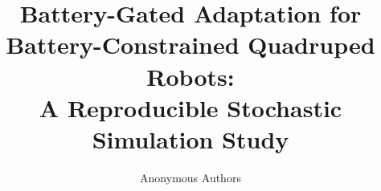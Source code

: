 \documentclass[11pt]{article}
\title{Battery-Gated Adaptation for Battery-Constrained Quadruped Robots:\\A Reproducible Stochastic Simulation Study}
\author{Anonymous Authors}
\date{}
\begin{document}
\maketitle

\begin{abstract}

\end{abstract}









\appendix




\end{document}
